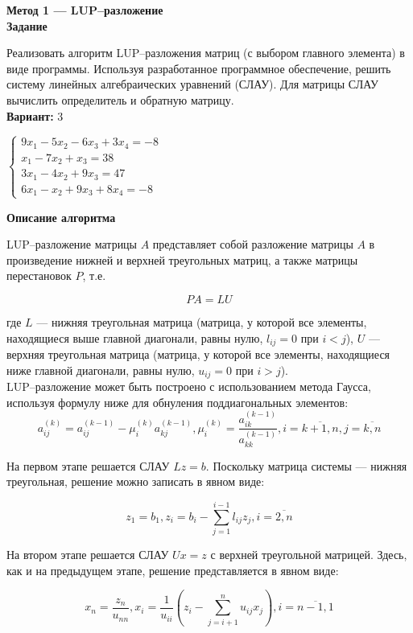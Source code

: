 \textbf{Метод 1 --- LUP--разложение}\\

\textbf{Задание}

Реализовать алгоритм LUP--разложения матриц (с выбором главного элемента) в виде программы. Используя разработанное программное обеспечение, решить систему линейных алгебраических уравнений (СЛАУ). Для матрицы СЛАУ вычислить определитель и обратную матрицу.\\

\textbf{Вариант:} 3

$
\begin{cases}
9x_1-5x_2-6x_3+3x_4=-8\\
x_1-7x_2+x_3=38\\
3x_1-4x_2+9x_3=47\\
6x_1-x_2+9x_3+8x_4=-8
\end{cases}
$
\vspace{0.5cm}

\textbf{Описание алгоритма}

LUP--разложение матрицы $A$ представляет собой разложение матрицы  $A$ в произведение нижней и верхней треугольных матриц, а также матрицы перестановок $P$, т.е.

$$
PA=LU
$$

где $L$ --- нижняя треугольная матрица (матрица, у которой все элементы, находящиеся выше главной диагонали, равны нулю, $l_{ij}=0$ при $i<j$), $U$ --- верхняя треугольная матрица (матрица, у которой все элементы, находящиеся ниже главной диагонали, равны нулю, $u_{ij}=0$ при $i>j$).\\

LUP--разложение может быть построено с использованием метода Гаусса, используя формулу ниже для обнуления поддиагональных элементов: 
$$
a_{ij}^{(k)}=a_{ij}^{(k-1)}-\mu_i^{(k)}a_{kj}^{(k-1)}, \mu_i^{(k)}=\frac{a_{ik}^{(k-1)}}{a_{kk}^{(k-1)}}, i=\overline{k+1,n}, j=\overline{k, n}
$$

На первом этапе решается СЛАУ $Lz=b$. Поскольку матрица системы --- нижняя треугольная, решение можно записать в явном виде:

$$
z_1=b_1, z_i=b_i-\sum_{j=1}^{i-1}l_{ij}z_j, i=\overline{2,n}
$$

На втором этапе решается СЛАУ $Ux=z$ с верхней треугольной матрицей. Здесь, как и на предыдущем этапе, решение представляется в явном виде:

$$
x_n=\frac{z_n}{u_{nn}}, x_i=\frac{1}{u_{ii}}(z_i-\sum_{j=i+1}^{n}u_{ij}x_j), i=\overline{n-1,1}
$$\\

